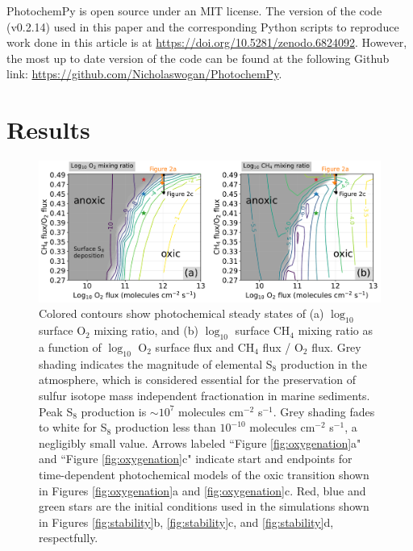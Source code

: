 PhotochemPy is open source under an MIT license. The version of the code (v0.2.14) used in this paper and the corresponding Python scripts to reproduce work done in this article is at \url{https://doi.org/10.5281/zenodo.6824092}. However, the most up to date version of the code can be found at the following Github link: \url{https://github.com/Nicholaswogan/PhotochemPy}.

\section{Results} \label{sec:goe_results}

\begin{figure}
  \centering
  \includegraphics[width=\textwidth]{tex/4goe/main/ArcheanOutgassing_sweep.pdf}
  \caption{Colored contours show photochemical steady states of (a) $\log_{10}$ surface O$_2$ mixing ratio, and (b) $\log_{10}$ surface CH$_4$ mixing ratio as a function of $\log_{10}$ O$_2$ surface flux and CH$_4$ flux / O$_2$ flux. Grey shading indicates the magnitude of elemental S$_8$ production in the atmosphere, which is considered essential for the preservation of sulfur isotope mass independent fractionation in marine sediments. Peak S$_8$ production is $\sim10^7$ molecules cm$^{-2}$ s$^{-1}$. Grey shading fades to white for S$_8$ production less than $10^{-10}$ molecules cm$^{-2}$ s$^{-1}$, a negligibly small value. Arrows labeled ``Figure \ref{fig:oxygenation}a" and ``Figure \ref{fig:oxygenation}c" indicate start and endpoints for time-dependent photochemical models of the oxic transition shown in Figures \ref{fig:oxygenation}a and \ref{fig:oxygenation}c. Red, blue and green stars are the initial conditions used in the simulations shown in Figures \ref{fig:stability}b, \ref{fig:stability}c, and \ref{fig:stability}d, respectfully.}
  \label{fig:sweep}
\end{figure}


